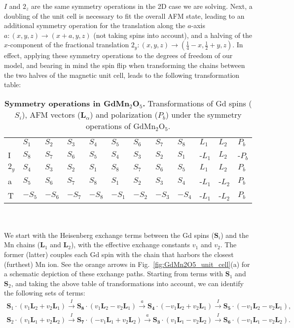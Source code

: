 $I$ and $2_z$ are the same symmetry operations in the 2D case we are solving.
Next, a doubling of the unit cell is necessary to fit the overall AFM state, leading to an additional symmetry operation for the translation along the $a$-axis $a: (x, y, z) \rightarrow (x + a, y, z)$ (not taking spins into account), and a halving of the $x$-component of the fractional translation $2_y: (x, y, z) \rightarrow (\frac{1}{4} - x, \frac{1}{2}+y, z)$.
In effect, applying these symmetry operations to the degrees of freedom of our model, and bearing in mind the spin flip when transforming the chains between the two halves of the magnetic unit cell, leads to the following transformation table:
\begin{table}[h]
\centering
\begin{tabular}{|l|lllllllllll|}
\cline{1-12}
 & $S_1$ & $S_2$ & $S_3$ & $S_4$ & $S_5$ & $S_6$ & $S_7$ & $S_8$ & $L_1$ & $L_2$ & $P_b$ \\ \cline{1-12}
I & $S_8$ & $S_7$ & $S_6$ & $S_5$ & $S_4$ & $S_3$ & $S_2$ & $S_1$ & -$L_1$ & $L_2$ & -$P_b$ \\ \cline{1-12}
$2_y$ & $S_4$ & $S_3$ & $S_2$ & $S_1$ & $S_8$ & $S_7$ & $S_6$ & $S_5$ & $L_1$ & $L_2$ & $P_b$ \\ \cline{1-12}
a & $S_5$ & $S_6$ & $S_7$ & $S_8$ & $S_1$ & $S_2$ & $S_3$ & $S_4$ & -$L_1$ & -$L_2$ & $P_b$ \\ \cline{1-12}
T & $-S_5$ & $-S_6$ & $-S_7$ & $-S_8$ & $-S_1$ & $-S_2$ & $-S_3$ & $-S_4$ & -$L_1$ & -$L_2$ & $P_b$ \\ \cline{1-12}
\end{tabular}
\caption{\label{tab:GdMn2O5_symm}{\bf Symmetry operations in GdMn$_2$O$_5$.} Transformations of Gd spins ($S_i$), AFM vectors ($\bm L_\alpha$) and polarization ($P_b$) under the symmetry operations of GdMn$_2$O$_5$.}
\end{table}\\\\
We start with the Heisenberg exchange terms between the Gd spins ($\bm{S}_i$) and the Mn chains ($\bm{L}_1$ and $\bm{L}_2$), with the effective exchange constants $v_1$ and $v_2$.
The former (latter) couples each Gd spin with the chain that harbors the closest (furthest) Mn ion. See the orange arrows in Fig.~\ref{fig:GdMn2O5_unit_cell}(a) for a schematic depiction of these exchange paths.
Starting from terms with $\bm{S}_1$ and $\bm{S}_2$, and taking the above table of transformations into account, we can identify the following sets of terms:
\begin{align}
	\bm{S}_1\cdot(v_1 \bm{L}_2 + v_2 \bm{L}_1) \xrightarrow{I} \bm{S_8}\cdot(v_1 \bm{L}_2 - v_2 \bm{L}_1) \xrightarrow{a} \bm{S_4} \cdot (- v_1 \bm{L}_2 + v_2 \bm{L}_1) \xrightarrow{I} \bm{S_5} \cdot (-v_1 \bm{L}_2 - v_2 \bm{L}_1), \nonumber\\
	\bm{S}_2\cdot(v_1 \bm{L}_1 + v_2 \bm{L}_2) \xrightarrow{I} \bm{S_7}\cdot(-v_1 \bm{L}_1 + v_2 \bm{L}_2) \xrightarrow{a} \bm{S_3} \cdot (v_1 \bm{L}_1 - v_2 \bm{L}_2) \xrightarrow{I} \bm{S_6} \cdot (-v_1 \bm{L}_1 - v_2 \bm{L}_2).
\end{align}
